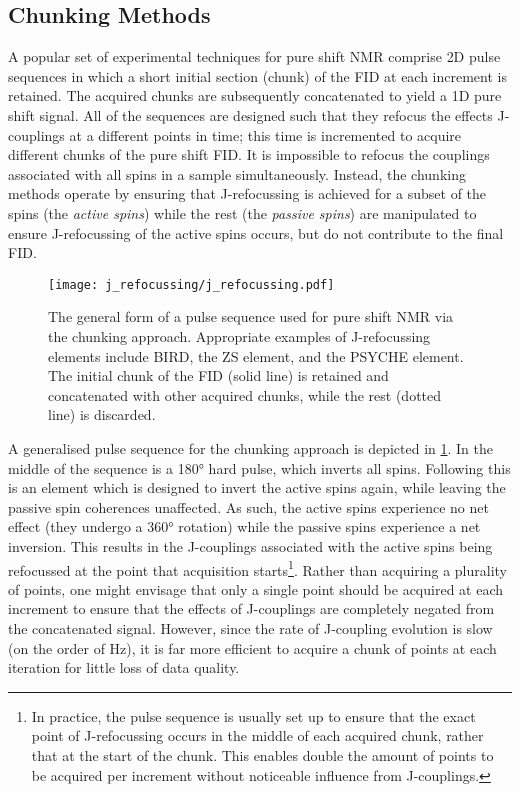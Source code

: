 \subsection{Chunking Methods}
A popular set of experimental techniques for pure shift \ac{NMR} comprise
\ac{2D} pulse sequences in which a short initial section (chunk) of the
\ac{FID} at each increment is retained\cite{Adams2014}. The acquired chunks are
subsequently concatenated to yield a \ac{1D} pure shift signal.  All of the
sequences are designed such that they refocus the effects J-couplings at a
different points in time; this time is incremented to acquire
different chunks of the pure shift \ac{FID}. It is impossible to refocus the
couplings associated with all spins in a sample simultaneously. Instead, the
chunking methods operate by ensuring that J-refocussing is achieved for a
subset of the spins (the \emph{active spins}) while the rest (the \emph{passive
spins}) are manipulated to ensure J-refocussing of the active spins occurs, but
do not contribute to the final \ac{FID}.

\begin{figure}
    \centering
    \texttt{[image: j\_refocussing/j\_refocussing.pdf]}
    \caption[
        The general form of a pulse sequence used for pure shift \acs{NMR}
        using the chunking approach.
    ]{
        The general form of a pulse sequence used for pure shift \acs{NMR}
        via the chunking approach. Appropriate examples of J-refocussing
        elements include \acs{BIRD}, the \acl{ZS} element, and the
        \acs{PSYCHE} element. The initial chunk of the \ac{FID} (solid
        line) is retained and concatenated with other acquired chunks,
        while the rest (dotted line) is discarded.
    }
    \label{fig:j-refocussing}
\end{figure}
\makeatletter
{}
\makeatother

A generalised pulse sequence for the chunking approach is depicted in
\cref{fig:j-refocussing}. In the middle of the sequence is a \ang{180} hard
pulse, which inverts all spins. Following this is an element which is designed
to invert the active spins again, while leaving the passive spin coherences
unaffected. As such, the active spins experience no net effect (they
undergo a \ang{360} rotation) while the passive spins experience a net inversion.
This results in the J-couplings associated with the active spins being
refocussed at the point that acquisition starts\footnote{
    In practice, the pulse sequence is usually set up to ensure that the exact
    point of J-refocussing occurs in the middle of each acquired chunk, rather
    that at the start of the chunk. This enables double the amount
    of points to be acquired per increment without noticeable influence from
    J-couplings.
}.
Rather than acquiring a plurality of points, one might envisage that only a
single point should be acquired at each increment to
ensure that the effects of J-couplings are completely negated from the
concatenated signal. However, since the rate of J-coupling evolution is
slow (on the order of \unit{\hertz}), it is far more efficient to acquire a
chunk of points at each iteration for little loss of data quality.

